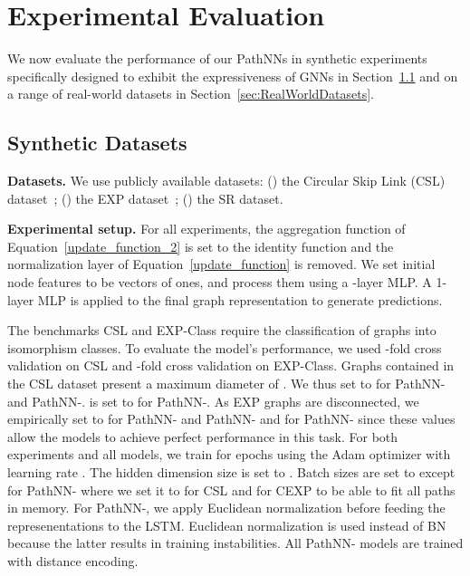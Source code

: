 \documentclass{article}
\theoremstyle{plain}
\theoremstyle{definition}
\theoremstyle{remark}
\begin{document}
\section{Experimental Evaluation}
We now evaluate the performance of our PathNNs in synthetic experiments specifically designed to exhibit the expressiveness of GNNs in Section~\ref{sec:SyntheticDatasets} and on a range of real-world datasets in Section~\ref{sec:RealWorldDatasets}. 

\subsection{Synthetic Datasets}
\label{sec:SyntheticDatasets}


\textbf{Datasets.}
We use  publicly available datasets: () the Circular Skip Link (CSL) dataset~\cite{murphy2019relational}; () the EXP dataset~\cite{abboud2021surprising}; () the SR dataset.

\textbf{Experimental setup.}
For all experiments, the aggregation function  of Equation~\eqref{update_function_2} is set to the identity function and the normalization layer of Equation~\eqref{update_function} is removed. 
We set initial node features to be vectors of ones, and process them using a -layer MLP.
A 1-layer MLP is applied to the final graph representation to generate predictions. 

The benchmarks CSL and EXP-Class require the classification of graphs into isomorphism classes. 
To evaluate the model's performance, we used -fold cross validation on CSL and -fold cross validation on EXP-Class. 
Graphs contained in the CSL dataset present a maximum diameter of . 
We thus set  to  for PathNN- and PathNN-.  
 is set to  for PathNN-.  
As EXP graphs are disconnected, we empirically set  to  for PathNN- and PathNN- and  for PathNN- since these values allow the models to achieve perfect performance in this task. 
For both experiments and all models, we train for  epochs using the Adam optimizer with learning rate .
The hidden dimension size is set to . 
Batch sizes are set to  except for PathNN- where we set it to  for CSL and  for CEXP to be able to fit all paths in memory.
For PathNN-, we apply Euclidean normalization before feeding the represenentations to the LSTM.
Euclidean normalization is used instead of BN because the latter results in training instabilities.
All PathNN- models are trained with distance encoding.
\end{document}
